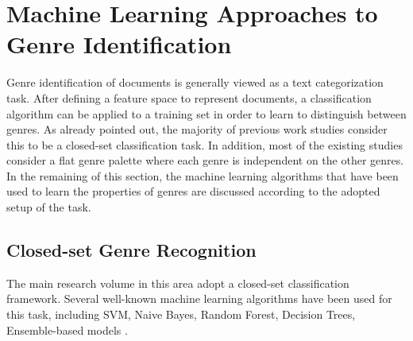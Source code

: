 

\section{Machine Learning Approaches to Genre Identification}
\label{chap:relevant_work:sec:machine_learning_methods}

Genre identification of documents is generally viewed as a text categorization task. After defining a feature space to represent documents, a classification algorithm can be applied to a training set in order to learn to distinguish between genres. As already pointed out, the majority of previous work studies consider this to be a closed-set classification task. In addition, most of the existing studies consider a flat genre palette where each genre is independent on the other genres. In the remaining of this section, the machine learning algorithms that have been used to learn the properties of genres are discussed according to the adopted setup of the task. 

\subsection{Closed-set Genre Recognition}

The main research volume in this area adopt a closed-set classification framework. Several well-known machine learning algorithms have been used for this task, including SVM, Naive Bayes, Random Forest, Decision Trees, Ensemble-based models \parencite{Lim2005,santini2007automatic,kanaris2009learning,jebari2015combination,sharoff2010web}. 

